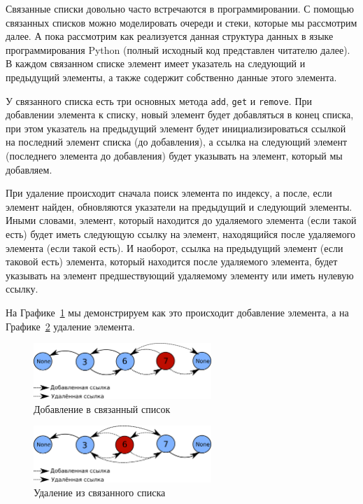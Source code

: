 Связанные списки довольно часто встречаются в программировании. 
С помощью связанных списков можно моделировать очереди и стеки,
которые мы рассмотрим далее. А пока рассмотрим как реализуется 
данная структура данных в языке программирования Python 
(полный исходный код представлен читателю далее). В каждом 
связанном списке элемент имеет указатель на следующий 
и предыдущий элементы, а также содержит собственно данные этого элемента.

У связанного списка есть три основных метода \texttt{add}, 
\texttt{get} и \texttt{remove}. 
При добавлении элемента к списку, новый элемент будет добавляться в конец списка,
при этом указатель на предыдущий элемент будет инициализироваться 
ссылкой на последний элемент списка (до добавления), а ссылка на следующий 
элемент (последнего элемента до добавления) будет 
указывать на элемент, который мы добавляем.

При удаление происходит сначала поиск элемента по индексу, 
а после, если элемент найден, обновляются указатели на предыдущий 
и следующий элементы. Иными словами, элемент, который находится 
до удаляемого элемента (если такой есть) будет иметь следующую ссылку 
на элемент, находящийся после удаляемого элемента (если такой есть). И наоборот, 
ссылка на предыдущий элемент (если таковой есть) элемента, который 
находится после удаляемого элемента, будет указывать 
на элемент предшествующий удаляемому элементу или иметь нулевую ссылку. 

На Графике~\ref{fig:linked_list_addition} мы демонстрируем как это происходит 
добавление элемента, а на Графике~\ref{fig:linked_list_deletion} удаление элемента. 

\begin{figure}
\centering
\includegraphics[width=0.6\textwidth]{graphics/linked_list_addition}
\caption{Добавление в связанный список}
\label{fig:linked_list_addition}
\end{figure}

\begin{figure}
\centering
\includegraphics[width=0.6\textwidth]{graphics/linked_list_deletion}
\caption{Удаление из связанного списка}
\label{fig:linked_list_deletion}
\end{figure}

